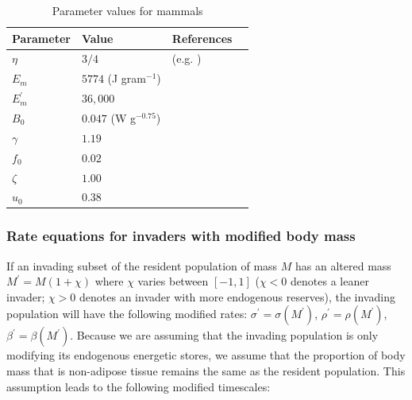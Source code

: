 \documentclass[twocolumn,preprintnumbers,amsmath,amssymb,superscriptaddress]{revtex4}
\begin{document}

 \begin{table}[h]
\caption{Parameter values for mammals}
\label{param}
    \begin{center}
    \small
     \begin{tabular}{ p{1.8cm} p{2.6cm} l p{2.2cm}|}
     \hline
     Parameter & Value & References  \\
     \hline
   $\eta$ & $3/4$  &  (e.g. \cite{supp:West:2001bv,supp:moses2008rmo,hou}) \\ 
   $E_{m}$ & $5774$ (J gram$^{-1}$)  &  \cite{supp:moses2008rmo,supp:West:2001bv,supp:hou} \\ 
   $E_{m}^{\prime}$ & $36,000$  & \cite{supp:stryer,supp:hou} \\ 
   $B_{0}$ & $0.047$ (W g$^{-0.75}$)    & \cite{supp:hou}  \\
   $\gamma$ & $1.19$ & \cite{supp:Lindstedt:1985hm} \\ 
   $f_{0}$ & $0.02$ & \cite{supp:Lindstedt:1985hm}\\ 
   $\zeta$ & $1.00$  & \cite{supp:Lindstedt:2002td} \\ 
   $u_{0}$ & $0.38$  & \cite{supp:Lindstedt:2002td} \\ 
      
   \hline
    \end{tabular}
    \end{center}
   \end{table}


\subsubsection*{Rate equations for invaders with modified body mass}
If an invading subset of the resident population of mass $M$ has an altered
mass $M^\prime = M(1+\chi)$ where $\chi$ varies between $[-1,1]$ ($\chi<0$
denotes a leaner invader; $\chi > 0$ denotes an invader with more endogenous
reserves), the invading population will have the following modified rates:
$\sigma^\prime = \sigma(M^\prime)$, $\rho^\prime = \rho(M^\prime)$,
$\beta^\prime = \beta(M^\prime)$.  Because we are assuming that the invading
population is only modifying its endogenous energetic stores, we assume that
the proportion of body mass that is non-adipose tissue remains the same as
the resident population.  This assumption leads to the following modified
timescales:
\end{document}
